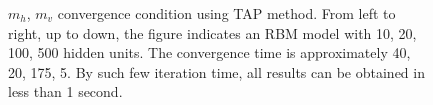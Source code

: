 \begin{figure}[t]
\begin{minipage}[t]{1\linewidth}
	\centering
\caption{$m_{h}$, $m_{v}$ convergence condition using TAP method. From left to right, up to down, the figure indicates an RBM model with 10, 20, 100, 500 hidden units. The convergence time is approximately 40, 20, 175, 5. By such few iteration time, all results can be obtained in less than 1 second.}
\label{fig:TAPmhmviter} %
\end{minipage}
\vspace{-0.05in}
\end{figure}
